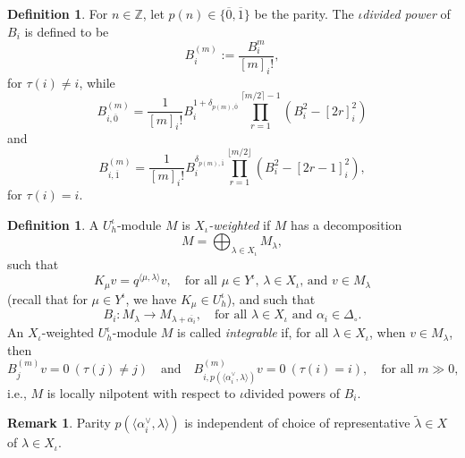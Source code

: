 \documentclass[10pt]{amsart}
\numberwithin{equation}{section}
\theoremstyle{definition}
\newtheorem{remark}[theorem]{Remark}
\newtheorem{definition}[theorem]{Definition}
\begin{document}
    \begin{definition}
        For $n\in \mathbb{Z}$, let $p(n)\in \{\overline{0},\overline{1}\}$ be the parity. The \emph{$\iota$divided power} of $B_i$ is defined to be
        \[
        B_i^{(m)}:=\frac{B_i^m}{[m]_i!}, 
        \]
        for $\tau(i) \ne i$, while
        \begin{equation}\label{eq:idivpowereven}
        B_{i,\overline{0}}^{(m)}=\frac{1}{[m]_i!}B_i^{1+\delta_{p(m),\overline{0}}}\prod_{r=1}^{\lceil m/2 \rceil -1}(B_i^2-[2r]_i^2)
        \end{equation}
        and
        \begin{equation}\label{eq:idivpowerodd}
        B_{i,\overline{1}}^{(m)}=\frac{1}{[m]_i!}B_i^{\delta_{p(m),\overline{1}}} \prod_{r=1}^{\lfloor m/2 \rfloor}(B_i^2-[2r-1]_i^2),
        \end{equation}
        for $\tau(i) = i$.
    \end{definition}
    \begin{definition}\label{def:iquantumintegrable}
        A $U_h^{\iota}$-module $M$ is \emph{$X_{\iota}$-weighted} if $M$ has a decomposition
        \[
        M=\bigoplus_{\lambda\in X_\iota} M_{\lambda},
        \]
        such that
        \[
        K_{\mu}v=q^{\langle \mu, \lambda \rangle}v, \quad \text{for all $\mu\in Y^\iota$, $\lambda\in X_\iota$, and $v\in M_{\lambda}$}
        \]
        (recall that for $\mu \in Y^{\iota}$, we have $K_{\mu}\in U_h^{\iota}$), and such that
        \[
        B_i:M_{\lambda}\rightarrow M_{\lambda + \overline{\alpha_i}},\quad  \text{for all $\lambda \in X_{\iota}$ and $\alpha_i\in \Delta_{\circ}$}.
        \]
        An $X_{\iota}$-weighted $U_h^{\iota}$-module $M$ is called \emph{integrable} if, for all $\lambda\in X_\iota$, when $v\in M_{\lambda}$, then 
        \[
        B_j^{(m)}v=0 \ (\tau(j) \neq j) \quad \text{and} \quad B_{i,p(\langle \alpha_i^{\vee},\lambda \rangle)}^{(m)}v=0 \ (\tau(i) =i), \quad \text{for all $m\gg 0$},
        \]
        i.e., $M$ is locally nilpotent with respect to $\iota$divided powers of $B_i$.
    \end{definition}

\begin{remark}
    Parity $p(\langle \alpha_i^\vee, \lambda \rangle )$ is independent of choice of representative $\widetilde\lambda \in X$ of $\lambda\in X_\iota$.
\end{remark}
\end{document}
